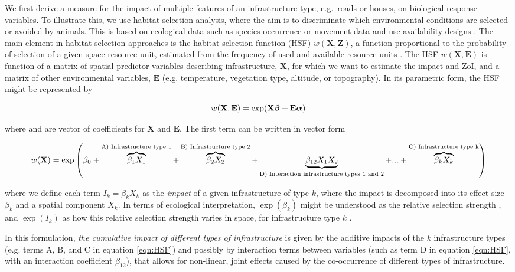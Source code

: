 \documentclass[titlepage]{article}
\begin{document}
We first derive a measure for the impact of multiple features of an infrastructure type, e.g.\ roads or houses, on biological response variables. To illustrate this, we use habitat selection analysis, where the aim is to discriminate which environmental conditions are selected or avoided by animals. This is based on ecological data such as species occurrence or movement data and use-availability designs \citep{fieberg_how_2021}. The main element in habitat selection approaches is the habitat selection function (HSF) $w(\textbf{X},\textbf{Z})$, a function proportional to the probability of selection of a given space resource unit, estimated from the frequency of used and available resource units \citep{thurfjell_applications_2014}. The HSF $w(\textbf{X},\textbf{E})$ is function of a matrix of spatial predictor variables describing infrastructure, $\textbf{X}$, for which we want to estimate the impact and ZoI, and a matrix of other environmental variables, $\textbf{E}$ (e.g. temperature, vegetation type, altitude, or topography). In its parametric form, the HSF might be represented by

\begin{equation}
\centering
\label{eqn:HSFgeneral}
    w(\textbf{X},\textbf{E}) = \exp (\textbf{X} \bm{\beta} + \textbf{E} \bm{\alpha})
\end{equation}

where \bm{$\beta$} and \bm{$\alpha$} are vector of coefficients for $\textbf{X}$ and $\textbf{E}$. The first term can be written in vector form

\begin{equation}
\centering
\label{eqn:HSF}
    w(\textbf{X}) = \exp \left( \beta_0 + \overbrace{\beta_1 X_1}^\text{A) Infrastructure type 1} + \overbrace{\beta_2 X_2}^\text{B) Infrastructure type 2} + \underbrace{\beta_{12} X_1 X_2}_\text{D) Interaction infrastructure types 1 and 2} + ... + \overbrace{\beta_k X_k}^\text{C) Infrastructure type k} \right)
\end{equation}

where we define each term $I_k = \beta_k X_k$ as the \textit{impact} of a given infrastructure of type $k$, where the impact is decomposed into its effect size $\beta_k$ and a spatial component $X_k$. In terms of ecological interpretation, $\exp(\beta_k)$ might be understood as the relative selection strength \citep{avgar_relative_2017}, and $\exp(I_k)$ as how this relative selection strength varies in space, for infrastructure type $k$ \citep{fieberg_how_2021}.

In this formulation, \textit{the cumulative impact of different types of infrastructure} is given by the additive impacts of the $k$ infrastructure types (e.g. terms A, B, and C in equation \ref{eqn:HSF}) and possibly by interaction terms between variables (such as term D in equation \ref{eqn:HSF}, with an interaction coefficient $\beta_{12}$), that allows for non-linear, joint effects caused by the co-occurrence of different types of infrastructure. 
\end{document}
